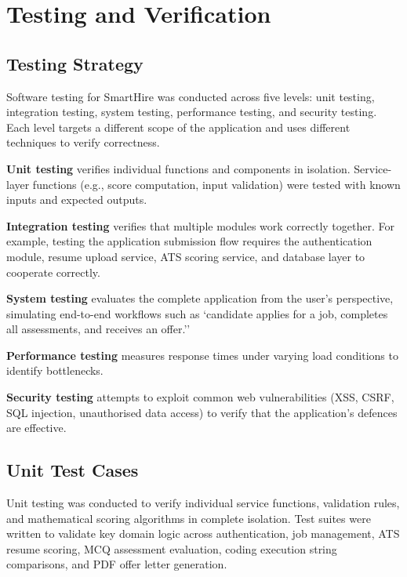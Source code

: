 \setcounter{chapter}{5}
\chapter{Testing and Verification}
\label{ch:testing}

\section{Testing Strategy}
\label{sec:test-strategy}

Software testing for SmartHire was conducted across five levels: unit testing, integration testing, system testing, performance testing, and security testing. Each level targets a different scope of the application and uses different techniques to verify correctness.

\textbf{Unit testing} verifies individual functions and components in isolation. Service-layer functions (e.g., score computation, input validation) were tested with known inputs and expected outputs.

\textbf{Integration testing} verifies that multiple modules work correctly together. For example, testing the application submission flow requires the authentication module, resume upload service, ATS scoring service, and database layer to cooperate correctly.

\textbf{System testing} evaluates the complete application from the user's perspective, simulating end-to-end workflows such as `candidate applies for a job, completes all assessments, and receives an offer.''

\textbf{Performance testing} measures response times under varying load conditions to identify bottlenecks.

\textbf{Security testing} attempts to exploit common web vulnerabilities (XSS, CSRF, SQL injection, unauthorised data access) to verify that the application's defences are effective.

\section{Unit Test Cases}
\label{sec:unit-tests}

Unit testing was conducted to verify individual service functions, validation rules, and mathematical scoring algorithms in complete isolation. Test suites were written to validate key domain logic across authentication, job management, ATS resume scoring, MCQ assessment evaluation, coding execution string comparisons, and PDF offer letter generation.

